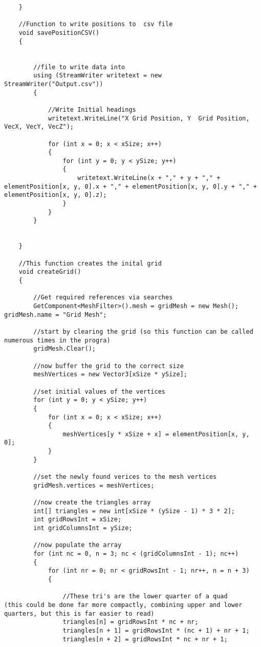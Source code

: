 \begin{mdframed}[linecolor=black, topline=true, bottomline=true,
  leftline=false, rightline=false]
\begin{verbatim}
    }

    //Function to write positions to  csv file
    void savePositionCSV()
    {


        //file to write data into
        using (StreamWriter writetext = new StreamWriter("Output.csv"))
        {

            //Write Initial headings
            writetext.WriteLine("X Grid Position, Y  Grid Position, VecX, VecY, VecZ");

            for (int x = 0; x < xSize; x++)
            {
                for (int y = 0; y < ySize; y++)
                {
                    writetext.WriteLine(x + "," + y + "," + elementPosition[x, y, 0].x + "," + elementPosition[x, y, 0].y + "," + elementPosition[x, y, 0].z);
                }
            }
        }


    }

    //This function creates the inital grid
    void createGrid()
    {

        //Get required references via searches
        GetComponent<MeshFilter>().mesh = gridMesh = new Mesh(); gridMesh.name = "Grid Mesh";

        //start by clearing the grid (so this function can be called numerous times in the progra)
        gridMesh.Clear();

        //now buffer the grid to the correct size
        meshVertices = new Vector3[xSize * ySize];

        //set initial values of the vertices
        for (int y = 0; y < ySize; y++)
        {
            for (int x = 0; x < xSize; x++)
            {
                meshVertices[y * xSize + x] = elementPosition[x, y, 0];
            }
        }

        //set the newly found verices to the mesh vertices
        gridMesh.vertices = meshVertices;

        //now create the triangles array
        int[] triangles = new int[xSize * (ySize - 1) * 3 * 2];
        int gridRowsInt = xSize;
        int gridColumnsInt = ySize;

        //now populate the array
        for (int nc = 0, n = 3; nc < (gridColumnsInt - 1); nc++)
        {
            for (int nr = 0; nr < gridRowsInt - 1; nr++, n = n + 3)
            {

                //These tri's are the lower quarter of a quad           (this could be done far more compactly, combining upper and lower quarters, but this is far easier to read)
                triangles[n] = gridRowsInt * nc + nr;
                triangles[n + 1] = gridRowsInt * (nc + 1) + nr + 1;
                triangles[n + 2] = gridRowsInt * nc + nr + 1;


\end{verbatim}
\end{mdframed}
